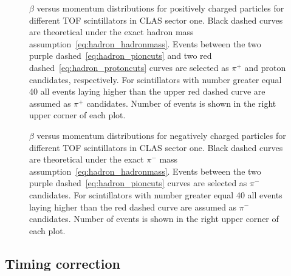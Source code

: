 

\begin{figure}[htp]
\begin{center}
\caption{\small  $\beta$ versus momentum distributions for positively charged particles for different TOF scintillators in CLAS sector one. Black dashed curves are theoretical under the exact hadron mass assumption~\ref{eq:hadron_hadronmass}. Events between the two purple dashed~\ref{eq:hadron_pioncuts} and two red dashed~\ref{eq:hadron_protoncuts} curves are selected as $\pi^{+}$ and proton candidates, respectively. For scintillators with number greater equal 40 all events laying higher than the upper red dashed curve are assumed as $\pi^{+}$ candidates. Number of events is shown in the right upper corner of each plot. \label{fig:b_vs_p_positive}} 
\end{center}
\end{figure}




\begin{figure}[htp]
\begin{center}
\caption{\small  $\beta$ versus momentum distributions for negatively charged particles for different TOF scintillators in CLAS sector one. Black dashed curves are theoretical under the exact $\pi^{-}$ mass assumption~\ref{eq:hadron_hadronmass}. Events between the two purple dashed~\ref{eq:hadron_pioncuts} curves are selected as $\pi^{-}$ candidates. For scintillators with number greater equal 40 all events laying higher than  the red dashed curve are assumed as  $\pi^{-}$ candidates. Number of events is shown in the right upper corner of each plot. \label{fig:b_vs_p_negative}} 
\end{center}
\end{figure}

\subsection{Timing correction}
\label{time_corr}

